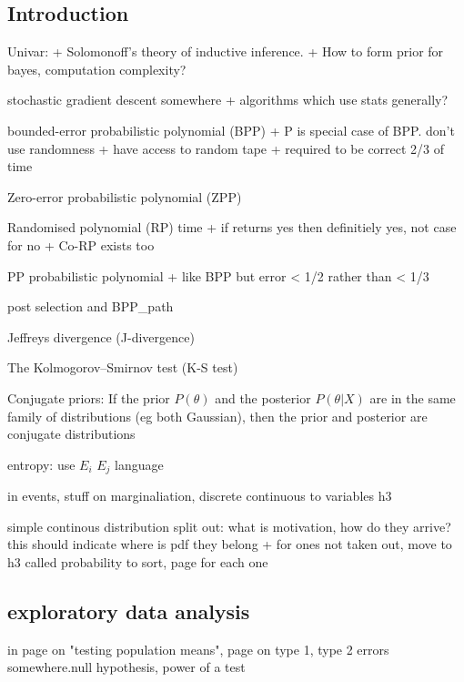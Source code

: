 
\subsection{Introduction}

Univar:
+ Solomonoff's theory of inductive inference.
+ How to form prior for bayes, computation complexity?

stochastic gradient descent somewhere
+ algorithms which use stats generally?

bounded-error probabilistic polynomial (BPP)
+ P is special case of BPP. don't use randomness
+ have access to random tape
+ required to be correct 2/3 of time

Zero-error probabilistic polynomial (ZPP)

Randomised polynomial (RP) time
+ if returns yes then definitiely yes, not case for no
+ Co-RP exists too

PP probabilistic polynomial
+ like BPP but error < 1/2 rather than < 1/3

post selection and BPP\_path

Jeffreys divergence (J-divergence)

The Kolmogorov–Smirnov test (K-S test)

Conjugate priors:
If the prior \(P(\theta)\) and the posterior \(P(\theta | X)\) are in the same family of distributions (eg both Gaussian), then the prior and posterior are conjugate distributions

entropy: use \(E_i\) \(E_j\) language

in events, stuff on marginaliation, discrete continuous to variables h3

simple continous distribution split out: what is motivation, how do they arrive? this should indicate where is pdf they belong
+ for ones not taken out, move to h3 called probability to sort, page for each one


\subsection{exploratory data analysis}

in page on "testing population means", page on type 1, type 2 errors somewhere.null hypothesis, power of a test


